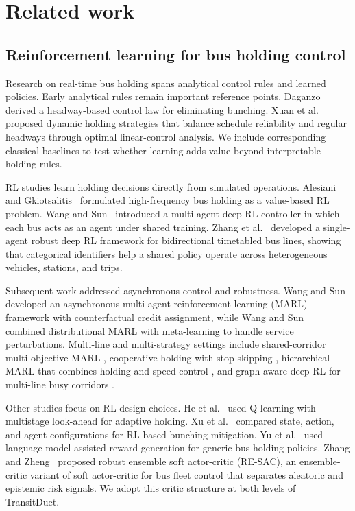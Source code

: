\section{Related work}\label{sec:related}

\subsection{Reinforcement learning for bus holding control}
\label{subsec:rl_holding}

Research on real-time bus holding spans analytical control rules and learned policies. Early analytical rules remain important reference points. Daganzo~\citep{daganzo2009headway} derived a headway-based control law for eliminating bunching. Xuan et al.~\citep{xuan2011dynamic} proposed dynamic holding strategies that balance schedule reliability and regular headways through optimal linear-control analysis. We include corresponding classical baselines to test whether learning adds value beyond interpretable holding rules.

RL studies learn holding decisions directly from simulated operations. Alesiani and Gkiotsalitis~\citep{alesiani2018reinforcement} formulated high-frequency bus holding as a value-based RL problem. Wang and Sun~\citep{wang2020real} introduced a multi-agent deep RL controller in which each bus acts as an agent under shared training. Zhang et al.~\citep{zhang2026single} developed a single-agent robust deep RL framework for bidirectional timetabled bus lines, showing that categorical identifiers help a shared policy operate across heterogeneous vehicles, stations, and trips.

Subsequent work addressed asynchronous control and robustness. Wang and Sun~\citep{wang2021asynchronous} developed an asynchronous multi-agent reinforcement learning (MARL) framework with counterfactual credit assignment, while Wang and Sun~\citep{wang2023robust} combined distributional MARL with meta-learning to handle service perturbations. Multi-line and multi-strategy settings include shared-corridor multi-objective MARL \citep{wang2023multiobjective}, cooperative holding with stop-skipping \citep{rodriguez2023cooperative}, hierarchical MARL that combines holding and speed control \citep{yu2024hierarchical}, and graph-aware deep RL for multi-line busy corridors \citep{li2026graphaware}.

Other studies focus on RL design choices. He et al.~\citep{he2022dynamic} used Q-learning with multistage look-ahead for adaptive holding. Xu et al.~\citep{xu2025systematic} compared state, action, and agent configurations for RL-based bunching mitigation. Yu et al.~\citep{yu2025llm} used language-model-assisted reward generation for generic bus holding policies. Zhang and Zheng~\citep{resac2026} proposed robust ensemble soft actor-critic (RE-SAC), an ensemble-critic variant of soft actor-critic for bus fleet control that separates aleatoric and epistemic risk signals. We adopt this critic structure at both levels of TransitDuet.

